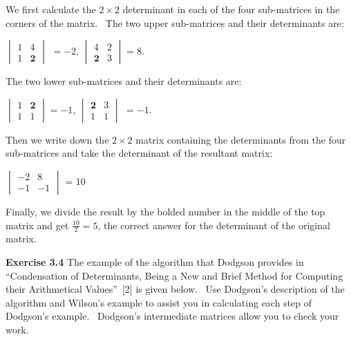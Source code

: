 \documentclass[11pt]{article}%
\theoremstyle{definition}
\begin{document}
We first calculate the $2\times2$ determinant in each of the four sub-matrices
in the corners of the matrix. \ The two upper sub-matrices and their
determinants are:

\begin{center}
$%
\begin{vmatrix}
1 & 4\\
1 & \mathbf{2}%
\end{vmatrix}
$ $=-2$, $%
\begin{vmatrix}
4 & 2\\
\mathbf{2} & 3
\end{vmatrix}
=8$.
\end{center}

The two lower sub-matrices and their determinants are:

\begin{center}
$%
\begin{vmatrix}
1 & \boldsymbol{2}\\
1 & 1
\end{vmatrix}
=-1$, $%
\begin{vmatrix}
\mathbf{2} & 3\\
1 & 1
\end{vmatrix}
$ $=-1.$
\end{center}

\bigskip

Then we write down the $2\times2$ matrix containing the determinants from the
four sub-matrices and take the determinant of the resultant matrix:

\begin{center}
$%
\begin{vmatrix}
-2 & 8\\
-1 & -1
\end{vmatrix}
$ = 10
\end{center}

Finally, we divide the result by the bolded number in the middle of the top
matrix and get $\frac{10}{2}=5$, the correct answer for the determinant of the
original matrix. \

\bigskip

\noindent\textbf{Exercise 3.4} The example of the algorithm that Dodgson
provides in \textquotedblleft Condensation of Determinants, Being a New and
Brief Method for Computing their Arithmetical Values\textquotedblright\ [2] is
given below. \ Use Dodgson's description of the algorithm and Wilson's example
to assist you in calculating each step of Dodgson's example. \ Dodgson's
intermediate matrices allow you to check your work.%
\end{document}
